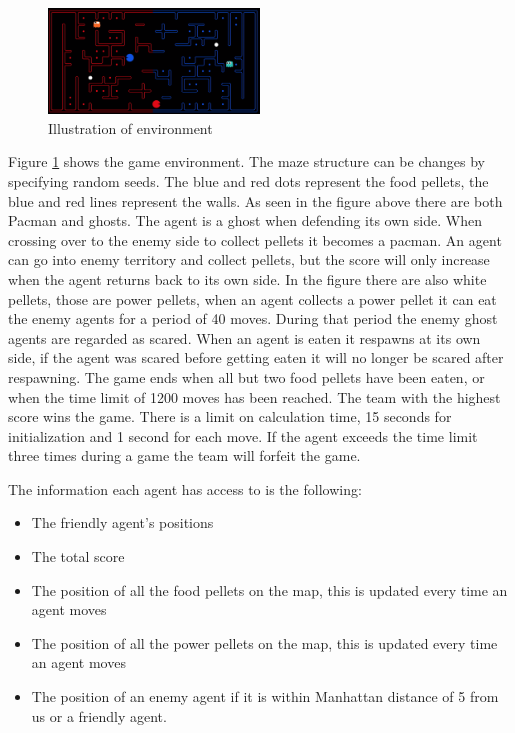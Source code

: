 \documentclass[a4paper,12pt]{article}
\begin{document}
\begin{figure}[!htbp]
  \centering
  \includegraphics[width=0.5\textwidth]{./figuresA4/pacman_illustration.png}
  \caption{Illustration of environment}
  \label{fig:drag_force}
\end{figure}

Figure \ref{fig:drag_force} shows the game environment. The maze structure can be changes by specifying random seeds. The blue and red dots represent the food pellets, the blue and red lines represent the walls. 
As seen in the figure above there are both Pacman and ghosts. The agent is a ghost when defending its own side. When crossing over to the enemy side to collect pellets it becomes a pacman.
An agent can go into enemy territory and collect pellets, but the score will only increase when the agent returns back to its own side. In the figure there are also white pellets, 
those are power pellets, when an agent collects a power pellet it can eat the enemy agents for a period of 40 moves. During that period the enemy ghost agents are regarded as scared.
When an agent is eaten it respawns at its own side, if the agent was scared before getting eaten it will no longer be scared after respawning.
The game ends when all but two food pellets have been eaten, or when the time limit of 1200 moves has been reached. The team with the highest score wins the game.
There is a limit on calculation time, 15 seconds for initialization and 1 second for each move. If the agent exceeds the time limit three times during a game the team will forfeit the game.

The information each agent has access to is the following:
\begin{itemize}
  \item The friendly agent's positions
  \item The total score
  \item The position of all the food pellets on the map, this is updated every time an agent moves
  \item The position of all the power pellets on the map, this is updated every time an agent moves
  \item The position of an enemy agent if it is within Manhattan distance of 5 from us or a friendly agent.
\end{itemize}
\end{document}
